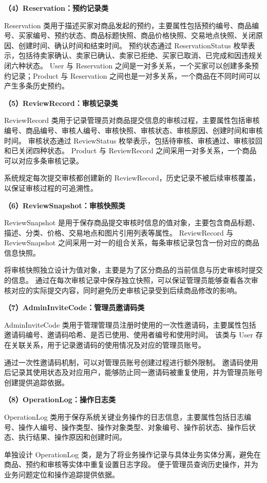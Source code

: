 \documentclass[12pt,a4paper]{article}
\begin{document}
	\textbf{（4）Reservation：预约记录类}
	
	Reservation 类用于描述买家对商品发起的预约，主要属性包括预约编号、商品编号、买家编号、预约状态、商品标题快照、商品价格快照、交易地点快照、关闭原因、创建时间、确认时间和结束时间。
	预约状态通过 ReservationStatus 枚举表示，包括待卖家确认、卖家已确认、卖家已拒绝、买家已取消、已完成和因违规关闭六种状态。
	User 与 Reservation 之间是一对多关系，一个买家可以创建多条预约记录；Product 与 Reservation 之间也是一对多关系，一个商品在不同时间可以产生多条历史预约。
		
	\textbf{（5）ReviewRecord：审核记录类}
	
	ReviewRecord 类用于记录管理员对商品提交信息的审核过程，主要属性包括审核编号、商品编号、审核人编号、审核快照、审核状态、审核原因、创建时间和审核时间。
	审核状态通过 ReviewStatus 枚举表示，包括待审核、审核通过、审核驳回和已关闭四种状态。
	Product 与 ReviewRecord 之间采用一对多关系，一个商品可以对应多条审核记录。
	
	系统规定每次提交审核都创建新的 ReviewRecord，历史记录不被后续审核覆盖，以保证审核过程的可追溯性。
	
	\textbf{（6）ReviewSnapshot：审核快照类}
	
	ReviewSnapshot 是用于保存商品提交审核时信息的值对象，主要包含商品标题、描述、分类、价格、交易地点和图片引用列表等属性。
	ReviewRecord 与 ReviewSnapshot 之间采用一对一的组合关系，每条审核记录包含一份对应的商品信息快照。
	
	将审核快照独立设计为值对象，主要是为了区分商品的当前信息与历史审核时提交的信息。
	通过在每次审核记录中保存独立快照，可以保证管理员能够查看各次审核对应的实际提交内容，同时避免历史审核记录受到后续商品修改的影响。
	
	\textbf{（7）AdminInviteCode：管理员邀请码类}
	
	AdminInviteCode 类用于管理管理员注册时使用的一次性邀请码，主要属性包括邀请码编号、邀请码哈希、是否已使用、使用者编号和使用时间。
	该类与 User 存在关联关系，用于记录邀请码的使用情况及对应的管理员账号。
	
	通过一次性邀请码机制，可以对管理员账号创建过程进行额外限制。
	邀请码使用后记录其使用状态及对应用户，能够防止同一邀请码被重复使用，并为管理员账号创建提供追踪依据。
	
	\textbf{（8）OperationLog：操作日志类}
	
	OperationLog 类用于保存系统关键业务操作的日志信息，主要属性包括日志编号、操作人编号、操作类型、操作对象类型、对象编号、操作前状态、操作后状态、执行结果、操作原因和创建时间。
	
	单独设计 OperationLog 类，是为了将业务操作记录与具体业务实体分离，避免在商品、预约和审核等实体中重复设置日志字段。	
	便于管理员查询历史操作，并为业务问题定位和操作追踪提供依据。
	
\end{document}
